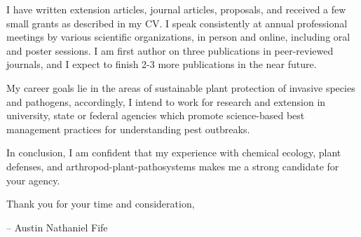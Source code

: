 \documentclass[11pt]{letter} %
\begin{document}
\begin{letter}
I have written extension articles, journal articles, proposals, and received a few small grants as described in my CV. I speak consistently at annual professional meetings by various scientific organizations, in person and online, including oral and poster sessions. I am first author on three publications in peer-reviewed journals, and I expect to finish 2-3 more publications in the near future.

My career goals lie in the areas of sustainable plant protection of invasive species and pathogens, accordingly, I intend to work for research and extension in university, state or federal agencies which promote science-based best management practices for understanding pest outbreaks. 

In conclusion, I am confident that my experience with chemical ecology, plant defenses, and arthropod-plant-pathosystems makes me a strong candidate for your agency.

Thank you for your time and consideration,

\quad -- Austin Nathaniel Fife

\thispagestyle{empty}

\end{letter}
\end{document}
